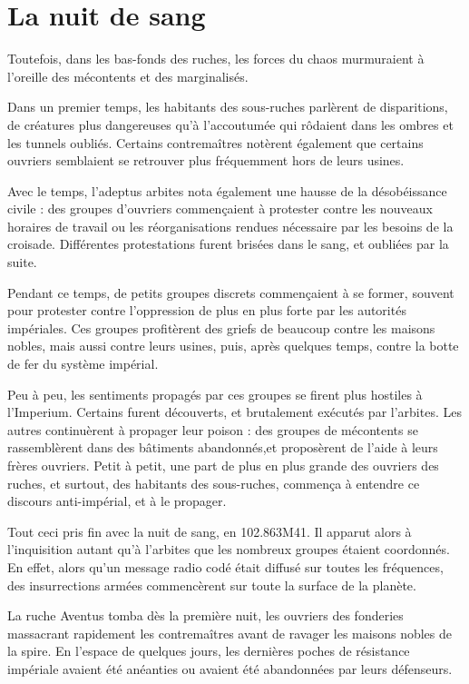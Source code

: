 \documentclass[10pt,a4paper]{book}
\begin{document}
\section{La nuit de sang}
Toutefois, dans les bas-fonds des ruches, les forces du chaos murmuraient à l'oreille des mécontents et des marginalisés. 

Dans un premier temps, les habitants des sous-ruches parlèrent de disparitions, de créatures plus dangereuses qu'à l'accoutumée qui rôdaient dans les ombres et les tunnels oubliés. Certains contremaîtres notèrent également que certains ouvriers semblaient se retrouver plus fréquemment hors de leurs usines.

Avec le temps, l'adeptus arbites nota également une hausse de la désobéissance civile : des groupes d'ouvriers commençaient à protester contre les nouveaux horaires de travail ou les réorganisations rendues nécessaire par les besoins de la croisade. Différentes protestations furent brisées dans le sang, et oubliées par la suite.

Pendant ce temps, de petits groupes discrets commençaient à se former, souvent pour protester contre l'oppression de plus en plus forte par les autorités impériales. Ces groupes profitèrent des griefs de beaucoup contre les maisons nobles, mais aussi contre leurs usines, puis, après quelques temps, contre la botte de fer du système impérial.

Peu à peu, les sentiments propagés par ces groupes se firent plus hostiles à l'Imperium. Certains furent découverts, et brutalement exécutés par l'arbites. Les autres continuèrent à propager leur poison : des groupes de mécontents se rassemblèrent dans des bâtiments abandonnés,et proposèrent de l'aide à leurs frères ouvriers. Petit à petit, une part de plus en plus grande des ouvriers des ruches, et surtout, des habitants des sous-ruches, commença à entendre ce discours anti-impérial, et à le propager.

Tout ceci pris fin avec la nuit de sang, en 102.863M41. Il apparut alors à l'inquisition autant qu'à l'arbites que les nombreux groupes étaient coordonnés. En effet, alors qu'un message radio codé était diffusé sur toutes les fréquences, des insurrections armées commencèrent sur toute la surface de la planète.

La ruche Aventus tomba dès la première nuit, les ouvriers des fonderies massacrant rapidement les contremaîtres avant de ravager les maisons nobles de la spire. En l'espace de quelques jours, les dernières poches de résistance impériale avaient été anéanties ou avaient été abandonnées par leurs défenseurs.
\end{document}
